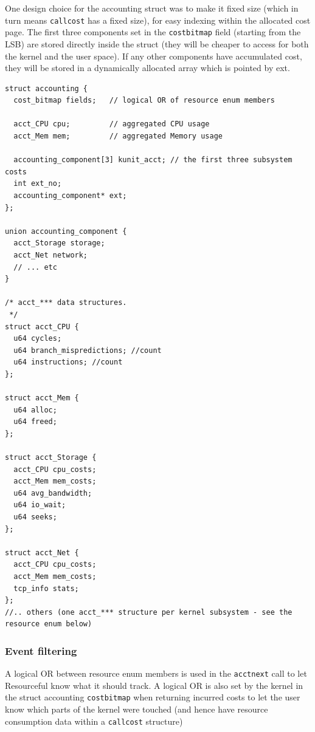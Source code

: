 \documentclass[12pt]{article}
\def\_{\textunderscore\-}
\begin{document}
One design choice for the accounting struct was to make it fixed size (which in turn means \texttt{call\_cost} has a fixed size), for easy indexing within the allocated cost page. The first three components set in the \texttt{cost\_bitmap} field (starting from the LSB) are stored directly inside the struct (they will be cheaper to access for both the kernel and the user space). If any other components have accumulated cost, they will be stored in a dynamically allocated array which is pointed by ext.

\vspace{1em}
\begin{lstlisting}
struct accounting {
  cost_bitmap fields;   // logical OR of resource enum members

  acct_CPU cpu;         // aggregated CPU usage
  acct_Mem mem;         // aggregated Memory usage

  accounting_component[3] kunit_acct; // the first three subsystem costs
  int ext_no;
  accounting_component* ext;
};

union accounting_component {
  acct_Storage storage;
  acct_Net network;
  // ... etc
}

/* acct_*** data structures.
 */
struct acct_CPU {
  u64 cycles;
  u64 branch_mispredictions; //count
  u64 instructions; //count
};

struct acct_Mem {
  u64 alloc;
  u64 freed;
};

struct acct_Storage {
  acct_CPU cpu_costs;
  acct_Mem mem_costs;
  u64 avg_bandwidth;
  u64 io_wait;
  u64 seeks;
};

struct acct_Net {
  acct_CPU cpu_costs;
  acct_Mem mem_costs;
  tcp_info stats;
};
//.. others (one acct_*** structure per kernel subsystem - see the resource enum below)
\end{lstlisting}


\subsubsection{Event filtering}\label{evfilt}
A logical OR between resource enum members is used in the \texttt{acct\_next} call to let Resourceful know what it should track. A logical OR is also set by the kernel in the struct accounting \texttt{cost\_bitmap} when returning incurred costs to let the user know which parts of the kernel were touched (and hence have resource consumption data within a \texttt{call\_cost} structure)
\end{document}
